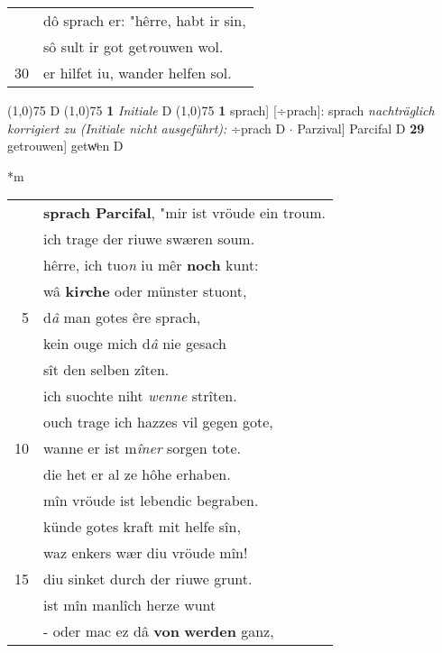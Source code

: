 \documentclass[8pt,a4paper,notitlepage]{article}
\begin{document}
\begin{table}[ht]
\begin{minipage}[t]{0.5\linewidth}
\begin{tabular}{rl}
 & dô sprach er: "hêrre, habt ir sin,\\ 
 & sô sult ir got get\textit{r}ouwen wol.\\ 
30 & er hilfet iu, wander helfen sol.\\ 
\end{tabular}
\scriptsize
\line(1,0){75} \newline
D \newline
\line(1,0){75} \newline
\textbf{1} \textit{Initiale} D  \newline
\line(1,0){75} \newline
\textbf{1} sprach] [÷prach]: sprach \textit{nachträglich korrigiert zu (Initiale nicht ausgeführt):} ÷prach D  $\cdot$ Parzival] Parcifal D \textbf{29} getrouwen] getwͦen D \newline
\end{minipage}
\hspace{0.5cm}
\begin{minipage}[t]{0.5\linewidth}
\small
\begin{center}*m
\end{center}
\begin{tabular}{rl}
 & \textbf{sprach Parcifal}, "mir ist vröude ein troum.\\ 
 & ich trage der riuwe swæren soum.\\ 
 & hêrre, ich tuo\textit{n} iu mêr \textbf{noch} kunt:\\ 
 & wâ \textbf{ki\textit{r}che} oder münster stuont,\\ 
5 & d\textit{â} man gotes êre sprach,\\ 
 & kein ouge mich d\textit{â} nie gesach\\ 
 & sît den selben zîten.\\ 
 & ich suochte niht \textit{wenne} strîten.\\ 
 & ouch trage ich hazzes vil gegen gote,\\ 
10 & wanne er ist m\textit{îner} sorgen tote.\\ 
 & die het er al ze hôhe erhaben.\\ 
 & mîn vröude ist lebendic begraben.\\ 
 & künde gotes kraft mit helfe sîn,\\ 
 & waz enkers wær diu vröude mîn!\\ 
15 & diu sinket durch der riuwe grunt.\\ 
 & ist mîn manlîch herze wunt\\ 
 & - oder mac ez dâ \textbf{von} \textbf{werden} ganz,\\ 

\end{tabular}
\end{minipage}
\end{table}
\end{document}
